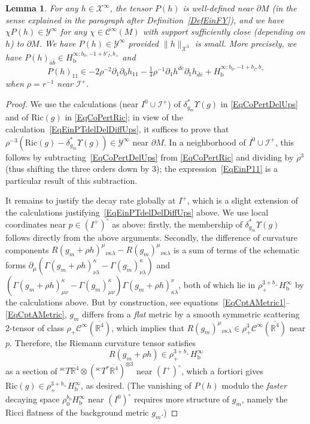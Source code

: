 \documentclass[reqno,11pt,letterpaper]{amsart}
\numberwithin{equation}{section}
\numberwithin{figure}{section}
\newtheorem{lemma}[thm]{Lemma}
\theoremstyle{definition}
\theoremstyle{remark}
\newcommand{\mc}{\mathcal}
\newcommand{\cC}{\mc C}
\newcommand{\cX}{\mc X}
\newcommand{\cY}{\mc Y}
\newcommand{\ms}{\mathscr}
\newcommand{\scri}{\ms I}
\newcommand{\R}{\mathbb{R}}
\newcommand{\Ups}{\Upsilon}
\newcommand{\ol}{\overline}
\newcommand{\pa}{\partial}
\newcommand{\bop}{{\mathrm{b}}}
\newcommand{\scl}{{\mathrm{sc}}}
\newcommand{\Tsc}{{}^{\scl}T}
\newcommand{\CI}{\cC^\infty}
\newcommand{\Hb}{H_{\bop}}
\newcommand{\Ric}{\mathrm{Ric}}
\newcommand{\usref}[1]{{\upshape\ref{#1}}}
\begin{document}
\begin{lemma}
\label{LemmaEinP}
  For any $h\in\cX^\infty$, the tensor $P(h)$ is well-defined near $\pa M$ (in the sense explained in the paragraph after Definition~\usref{DefEinFY}), and we have $\chi P(h)\in\cY^\infty$ for any $\chi\in\CI(M)$ with support sufficiently close (depending on $h$) to $\pa M$. We have $P(h)\in\cY^\infty$ provided $\|h\|_{\cX^3}$ is small. More precisely, we have $P(h)_{\bar a\bar b}\in\Hb^{\infty;b_0,-1+b'_I,b_+}$ and
  \begin{equation}
  \label{EqEinP11}
    P(h)_{1 1} \in -2\rho^{-2}\pa_1\pa_0 h_{1 1} - \tfrac14 \rho^{-1}\pa_1 h^{\bar d\bar e}\pa_1 h_{\bar d\bar e} + \Hb^{\infty;b_0,-1+b_I,b_+}
  \end{equation}
  when $\rho=r^{-1}$ near $\scri^+$.
\end{lemma}
\begin{proof}
  We use the calculations (near $I^0\cup\scri^+$) of $\delta_{g_m}^*\Ups(g)$ in \eqref{EqCoPertDelUps} and of $\Ric(g)$ in \eqref{EqCoPertRic}; in view of the calculation~\eqref{EqEinPTdelDelDiffUps}, it suffices to prove that $\rho^{-3}(\Ric(g)-\delta_{g_m}^*\Ups(g))\in\cY^\infty$ near $\pa M$. In a neighborhood of $I^0\cup\scri^+$, this follows by subtracting~\eqref{EqCoPertDelUps} from \eqref{EqCoPertRic} and dividing by $\rho^3$ (thus shifting the three orders down by $3$); the expression~\eqref{EqEinP11} is a particular result of this subtraction.

  It remains to justify the decay rate globally at $I^+$, which is a slight extension of the calculations justifying~\eqref{EqEinPTdelDelDiffUps} above. We use local coordinates near $p\in(I^+)^\circ$ as above: firstly, the membership of $\delta_{g_m}^*\Ups(g)$ follows directly from the above arguments. Secondly, the difference of curvature components $R(g_m+\rho h)^\mu{}_{\nu\kappa\lambda}-R(g_m)^\mu{}_{\nu\kappa\lambda}$ is a sum of terms of the schematic forms $\pa_\mu(\Gamma(g_m+\rho h)^\kappa_{\nu\lambda}-\Gamma(g_m)^\kappa_{\nu\lambda})$ and $(\Gamma(g_m+\rho h)_{\mu\nu}^\kappa-\Gamma(g_m)_{\mu\nu}^\kappa)\Gamma(g_m+\rho h)_{\kappa\lambda}^\nu$, both of which lie in $\rho_+^{3+b_+}\Hb^\infty$ by the calculations above. But by construction, see equations~\eqref{EqCptAMetric1}--\eqref{EqCptAMetric}, $g_m$ differs from a \emph{flat} metric by a smooth symmetric scattering 2-tensor of class $\rho_+\CI(\ol{\R^4})$, which implies that $R(g_m)^\mu{}_{\nu\kappa\lambda}\in\rho_+^3\CI(\ol{\R^4})$ near $p$. Therefore, the Riemann curvature tensor satisfies
  \begin{equation}
  \label{EqEinPRiem}
    R(g_m+\rho h) \in \rho_+^{3+b_+}\Hb^\infty
  \end{equation}
  as a section of $\Tsc\ol{\R^4}\otimes(\Tsc^*\ol{\R^4})^{\otimes 3}$ near $(I^+)^\circ$, which a fortiori gives $\Ric(g)\in\rho_+^{3+b_+}\Hb^\infty$, as desired. (The vanishing of $P(h)$ modulo the \emph{faster} decaying space $\rho_0^{b_0}\Hb^\infty$ near $(I^0)^\circ$ requires more structure of $g_m$, namely the Ricci flatness of the background metric $g_m$.)
\end{proof}
\end{document}
